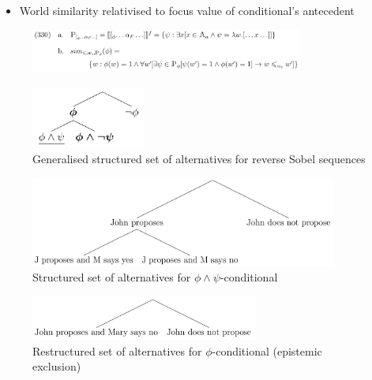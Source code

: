 \begin{frame}[t]
\subsectionpage\vskip 9pt
\begin{itemize}
    \item World similarity relativised to focus value of conditional's antecedent
\end{itemize}\vfill
\begin{figure}
    \centering
    \includegraphics[width=0.8\textwidth]{graphics/ippolito-conditional-semantics.png}
\end{figure}\vfill
\end{frame}

\begin{frame}[t]
\subsectionpage\vskip 9pt\vfill
\begin{figure}
    \centering
    \includegraphics[width=0.3333\textwidth]{graphics/ippolito-general-rss-tree.png}
    \caption{Generalised structured set of alternatives for reverse Sobel sequences}
\end{figure}\vfill
\end{frame}

\begin{frame}[t]
\subsectionpage\vskip 9pt\vfill
\begin{figure}
    \centering
    \includegraphics[width=0.9\textwidth]{graphics/ippolito-rss-prerestructure.png}
    \caption{Structured set of alternatives for $\phi\land\psi$-conditional}
\end{figure}\vfill
\end{frame}

\begin{frame}[t]
\subsectionpage\vskip 9pt\vfill
\begin{figure}
    \centering
    \includegraphics[width=0.6666\textwidth]{graphics/ippolito-rss-postrestructure.png}
    \caption{Restructured set of alternatives for $\phi$-conditional (epistemic exclusion)}
\end{figure}\vfill
\end{frame}


